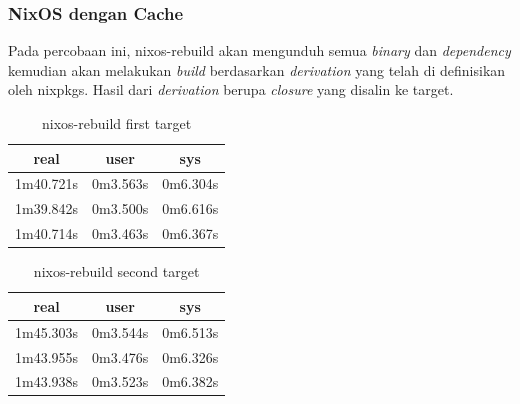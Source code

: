 \documentclass[10pt,]{report}
\begin{document}
\begin{adjustwidth}{20pt}{}
	\subsubsection{NixOS dengan Cache}
	\begin{adjustwidth}{20pt}{}
		Pada percobaan ini, nixos-rebuild akan mengunduh semua \textit{binary} dan
		\textit{dependency} kemudian akan melakukan \textit{build} berdasarkan
		\textit{derivation} yang telah di definisikan oleh nixpkgs. Hasil dari
		\textit{derivation} berupa \textit{closure} yang disalin ke target.
		\begin{table}[H]
			\caption{nixos-rebuild first target}
			\begin{center}
				\begin{tabular}[c]{|c|c|c|}
					\hline
					\multicolumn{1}{|c|}{\textbf{real}} &
					\multicolumn{1}{c|}{\textbf{user}}  &
					\multicolumn{1}{c|}{\textbf{sys}}                         \\
					\hline
					1m40.721s                           & 0m3.563s & 0m6.304s \\
					\hline
					1m39.842s                           & 0m3.500s & 0m6.616s \\
					\hline
					1m40.714s                           & 0m3.463s & 0m6.367s \\
					\hline
				\end{tabular}
			\end{center}
		\end{table}
		\begin{table}[H]
			\caption{nixos-rebuild second target}
			\begin{center}
				\begin{tabular}[c]{|c|c|c|}
					\hline
					\multicolumn{1}{|c|}{\textbf{real}} &
					\multicolumn{1}{c|}{\textbf{user}}  &
					\multicolumn{1}{c|}{\textbf{sys}}                         \\
					\hline
					1m45.303s                           & 0m3.544s & 0m6.513s \\
					\hline
					1m43.955s                           & 0m3.476s & 0m6.326s \\
					\hline
					1m43.938s                           & 0m3.523s & 0m6.382s \\
					\hline
				\end{tabular}
			\end{center}
		\end{table}
	\end{adjustwidth}

\end{adjustwidth}
\end{document}
